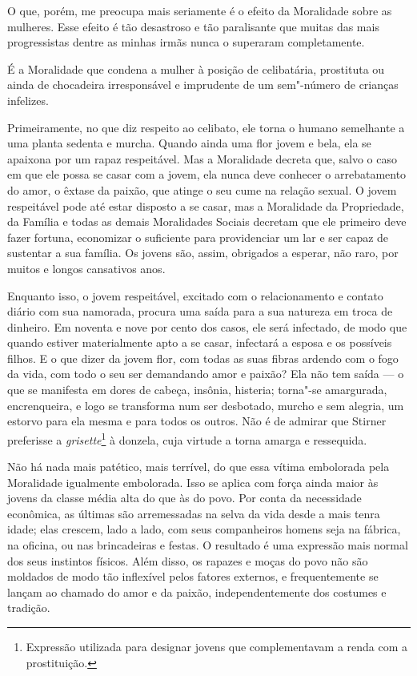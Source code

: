 \asterisc

O que, porém, me preocupa mais seriamente é o efeito da Moralidade sobre
as mulheres. Esse efeito é tão desastroso e tão paralisante que muitas
das mais progressistas dentre as minhas irmãs nunca o superaram
completamente.

É a Moralidade que condena a mulher à posição de celibatária, prostituta
ou ainda de chocadeira irresponsável e imprudente de um sem"-número de
crianças infelizes.

Primeiramente, no que diz respeito ao celibato, ele torna o humano
semelhante a uma planta sedenta e murcha. Quando ainda uma flor jovem e
bela, ela se apaixona por um rapaz respeitável. Mas a Moralidade decreta
que, salvo o caso em que ele possa se casar com a jovem, ela nunca deve
conhecer o arrebatamento do amor, o êxtase da paixão, que atinge o seu
cume na relação sexual. O jovem respeitável pode até estar disposto a se
casar, mas a Moralidade da Propriedade, da Família e todas as demais
Moralidades Sociais decretam que ele primeiro deve fazer fortuna,
economizar o suficiente para providenciar um lar e ser capaz de
sustentar a sua família. Os jovens são, assim, obrigados a esperar, não
raro, por muitos e longos cansativos anos.

Enquanto isso, o jovem respeitável, excitado com o relacionamento e
contato diário com sua namorada, procura uma saída para a sua natureza em
troca de dinheiro. Em noventa e nove por cento dos casos, ele será
infectado, de modo que quando estiver materialmente apto a se casar,
infectará a esposa e os possíveis filhos. E o que dizer da jovem flor,
com todas as suas fibras ardendo com o fogo da vida, com todo o seu ser
demandando amor e paixão? Ela não tem saída --- o que se manifesta em
dores de cabeça, insônia, histeria; torna"-se amargurada, encrenqueira, e
logo se transforma num ser desbotado, murcho e sem alegria, um estorvo
para ela mesma e para todos os outros. Não é de admirar que Stirner
preferisse a \emph{grisette}\footnote{Expressão utilizada para designar
  jovens que complementavam a renda com a prostituição.} à donzela, cuja
virtude a torna amarga e ressequida.

Não há nada mais patético, mais terrível, do que essa vítima embolorada
pela Moralidade igualmente embolorada. Isso se aplica com força ainda
maior às jovens da classe média alta do que às do povo. Por conta da
necessidade econômica, as últimas são arremessadas na selva da vida
desde a mais tenra idade; elas crescem, lado a lado, com seus
companheiros homens seja na fábrica, na oficina, ou nas brincadeiras e
festas. O resultado é uma expressão mais normal dos seus instintos
físicos. Além disso, os rapazes e moças do povo não são moldados de modo
tão inflexível pelos fatores externos, e frequentemente se lançam ao
chamado do amor e da paixão, independentemente dos costumes e tradição.

